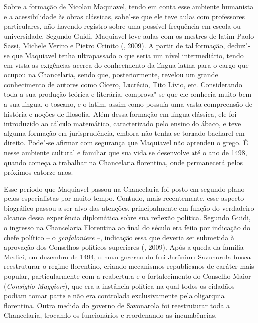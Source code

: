 Sobre a formação de Nicolau Maquiavel, tendo em conta esse ambiente
humanista e a acessibilidade às obras clássicas, sabe"-se que ele teve
aulas com professores particulares, não havendo registro sobre uma
possível frequência em escola ou universidade. Segundo Guidi, Maquiavel
teve aulas com os mestres de latim Paolo Sassi, Michele Verino e Pietro
Crinito (, 2009). A partir de tal formação, deduz"-se que Maquiavel
tenha ultrapassado o que seria um nível intermediário, tendo em vista as
exigências acerca do conhecimento da língua latina para o cargo que
ocupou na Chancelaria, sendo que, posteriormente, revelou um grande
conhecimento de autores como Cícero, Lucrécio, Tito Lívio, etc.
Considerando toda a sua produção teórica e literária, comprova"-se que
ele conhecia muito bem a sua língua, o toscano, e o latim, assim como
possuía uma vasta compreensão de história e noções de filosofia. Além
dessa formação em língua clássica, ele foi introduzido ao cálculo
matemático, caracterizado pelo ensino do ábaco, e teve alguma formação
em jurisprudência, embora não tenha se tornado bacharel em direito.
Pode"-se afirmar com segurança que Maquiavel não aprendeu o grego. É
nesse ambiente cultural e familiar que sua vida se desenvolve até o ano
de 1498, quando começa a trabalhar na Chancelaria florentina, onde
permanecerá pelos próximos catorze anos.

Esse período que Maquiavel passou na Chancelaria foi posto em segundo
plano pelos especialistas por muito tempo. Contudo, mais recentemente,
esse aspecto biográfico passou a ser alvo das atenções, principalmente
em função do verdadeiro alcance dessa experiência diplomática sobre sua
reflexão política. Segundo Guidi, o ingresso na Chancelaria Florentina
ao final do século  era feito por indicação do chefe político -- o
\emph{gonfaloniere} --, indicação essa que deveria ser submetida à
aprovação dos Conselhos políticos superiores (, 2009). Após a queda
da família Medici, em dezembro de 1494, o novo governo do frei Jerônimo
Savonarola busca reestruturar o regime florentino, criando mecanismos
republicanos de caráter mais popular, particularmente com a reabertura e
o fortalecimento do Conselho Maior (\emph{Consiglio Maggiore}), que era
a instância política na qual todos os cidadãos podiam tomar parte e não
era controlada exclusivamente pela oligarquia florentina. Outra medida
do governo de Savonarola foi reestruturar toda a Chancelaria, trocando
os funcionários e reordenando as incumbências.

